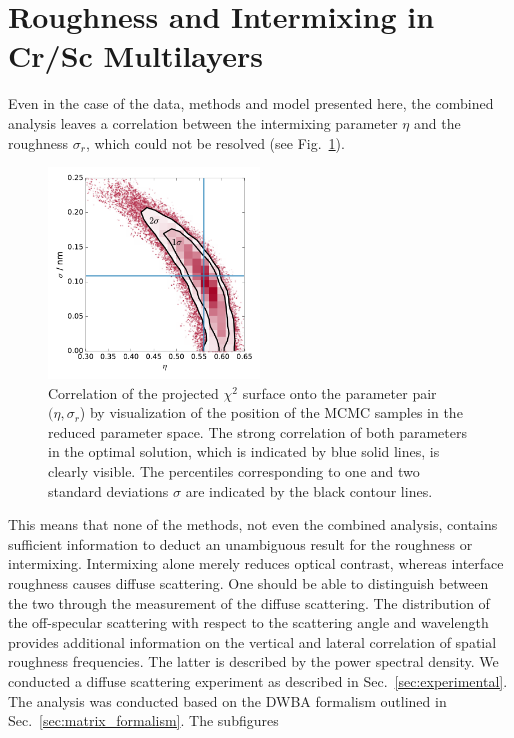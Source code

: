 \section{Roughness and Intermixing in Cr/Sc Multilayers} \label{ch_diff:sec_CrSc}
Even in the case of the data, methods and model presented here, the combined 
analysis leaves a correlation between the intermixing parameter $\eta$ and the 
roughness $\sigma_r$, which could not be resolved (see 
Fig.~\ref{fig:eta_sigma_correlation}).
\begin{figure}[htbp]
  \centering
  \includegraphics[width=0.5\textwidth]{images/eta_sigma_correlation}
  \caption{Correlation of the projected $\chi^2$ surface onto the parameter 
pair $(\eta, \sigma_r$) by visualization of the position of the MCMC samples in 
the reduced parameter space. The strong correlation of both parameters in the 
optimal solution, which is indicated by blue solid lines, is clearly visible. 
The percentiles corresponding to one and two standard deviations $\sigma$ are 
indicated by the black contour lines.}
  \label{fig:eta_sigma_correlation}
\end{figure}
This means that none of the methods, not even the combined analysis, contains 
sufficient information to deduct an unambiguous result for the roughness or 
intermixing. Intermixing alone merely reduces optical contrast, whereas 
interface roughness causes diffuse scattering. One should be able to 
distinguish between the two through the measurement of the diffuse scattering. 
The distribution of the off-specular scattering with respect to the scattering 
angle and wavelength provides additional information on the vertical and 
lateral correlation of spatial roughness frequencies. The latter is described 
by the power spectral density. We conducted a diffuse scattering experiment as 
described in Sec.~\ref{sec:experimental}. The analysis was conducted based on 
the DWBA formalism outlined in Sec.~\ref{sec:matrix_formalism}. The subfigures 
